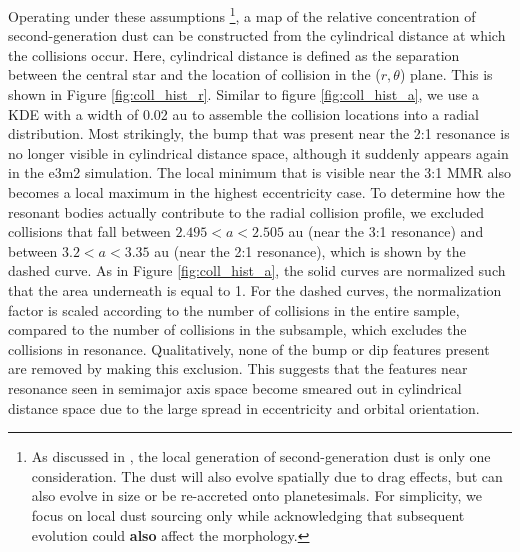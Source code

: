 Operating under these assumptions \footnote{As discussed in \cite{boley17}, the local generation of second-generation dust is 
only one consideration. The dust will also evolve spatially due to drag effects, but can also evolve in size or be re-accreted onto 
planetesimals. For simplicity, we focus on local dust sourcing only while acknowledging that subsequent evolution could 
\textbf{also} affect the morphology.}, a map of the relative concentration of second-generation dust can be constructed from the 
cylindrical distance at which the collisions occur. Here, cylindrical distance is defined as the separation between the central star 
and the location of collision in the ($r, \theta$) plane. This is shown in Figure \ref{fig:coll_hist_r}. Similar to figure 
\ref{fig:coll_hist_a}, we use a KDE with a width of 0.02 au to assemble the collision locations into a radial distribution. Most 
strikingly, the bump that was present near the 2:1 resonance is no longer visible in cylindrical distance space, although it 
suddenly appears again in the e3m2 simulation. The local minimum that is visible near the 3:1 MMR also becomes a local 
maximum in the highest eccentricity case. To determine how the resonant bodies actually contribute to the radial collision profile, 
we excluded collisions that fall between $2.495 < a < 2.505$ au (near the 3:1 resonance) and between $3.2 < a < 3.35$ au (near 
the 2:1 resonance), which is shown by the dashed curve. As in Figure \ref{fig:coll_hist_a}, the solid curves are normalized such 
that the area underneath is equal to 1. For the dashed curves, the normalization factor is scaled according to the number of 
collisions in the entire sample, compared to the number of collisions in the subsample, which excludes the collisions in 
resonance. Qualitatively, none of the bump or dip features present are removed by making this exclusion. This suggests that the 
features near resonance seen in semimajor axis space become smeared out in cylindrical distance space due to the large 
spread in eccentricity and orbital orientation.

